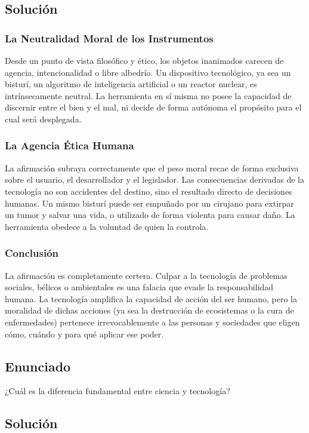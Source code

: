 \documentclass[12pt, a4paper]{article}
\begin{document}
\subsection*{Solución}

\subsubsection*{La Neutralidad Moral de los Instrumentos}
Desde un punto de vista filosófico y ético, los objetos inanimados carecen de agencia, intencionalidad o libre albedrío. Un dispositivo tecnológico, ya sea un bisturí, un algoritmo de inteligencia artificial o un reactor nuclear, es intrínsecamente neutral. La herramienta en sí misma no posee la capacidad de discernir entre el bien y el mal, ni decide de forma autónoma el propósito para el cual será desplegada.

\subsubsection*{La Agencia Ética Humana}
La afirmación subraya correctamente que el peso moral recae de forma exclusiva sobre el usuario, el desarrollador y el legislador. Las consecuencias derivadas de la tecnología no son accidentes del destino, sino el resultado directo de decisiones humanas. Un mismo bisturí puede ser empuñado por un cirujano para extirpar un tumor y salvar una vida, o utilizado de forma violenta para causar daño. La herramienta obedece a la voluntad de quien la controla.

\subsubsection*{Conclusión}
La afirmación es completamente certera. Culpar a la tecnología de problemas sociales, bélicos o ambientales es una falacia que evade la responsabilidad humana. La tecnología amplifica la capacidad de acción del ser humano, pero la moralidad de dichas acciones (ya sea la destrucción de ecosistemas o la cura de enfermedades) pertenece irrevocablemente a las personas y sociedades que eligen cómo, cuándo y para qué aplicar ese poder.

\newpage

\subsection*{Enunciado}
¿Cuál es la diferencia fundamental entre ciencia y tecnología?

\subsection*{Solución}
\end{document}
